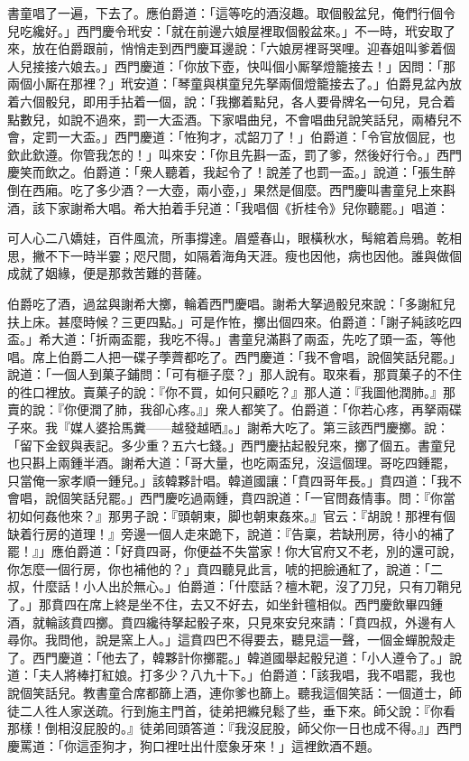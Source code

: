 書童唱了一遍，下去了。應伯爵道：「這等吃的酒沒趣。取個骰盆兒，俺們行個令兒吃纔好。」西門慶令玳安：「就在前邊六娘屋裡取個骰盆來。」不一時，玳安取了來，放在伯爵跟前，悄悄走到西門慶耳邊說：「六娘房裡哥哭哩。迎春姐叫爹着個人兒接接六娘去。」西門慶道：「你放下壺，快叫個小厮拏燈籠接去！」因問：「那兩個小厮在那裡？」玳安道：「琴童與棋童兒先拏兩個燈籠接去了。」伯爵見盆內放着六個骰兒，即用手拈着一個，說：「我擲着點兒，各人要骨牌名一句兒，見合着點數兒，如說不過來，罰一大盃酒。下家唱曲兒，不會唱曲兒說笑話兒，兩樁兒不會，定罰一大盃。」西門慶道：「恠狗才，忒韶刀了！」伯爵道：「令官放個屁，也欽此欽遵。你管我怎的！」叫來安：「你且先斟一盃，罰了爹，然後好行令。」西門慶笑而飲之。伯爵道：「衆人聽着，我起令了！說差了也罰一盃。」說道：「張生醉倒在西廂。吃了多少酒？一大壺，兩小壺，」果然是個麼。西門慶叫書童兒上來斟酒，該下家謝希大唱。希大拍着手兒道：「我唱個《折桂令》兒你聽罷。」唱道：

\begin{myquote} 
可人心二八嬌娃，百件風流，所事撐達。眉蹙春山，眼橫秋水，髩綰着烏鴉。乾相思，撇不下一時半霎；咫尺間，如隔着海角天涯。瘦也因他，病也因他。誰與做個成就了姻緣，便是那救苦難的菩薩。
\end{myquote} 

伯爵吃了酒，過盆與謝希大擲，輪着西門慶唱。謝希大拏過骰兒來說：「多謝紅兒扶上床。甚麼時候？三更四點。」可是作恠，擲出個四來。伯爵道：「謝子純該吃四盃。」希大道：「折兩盃罷，我吃不得。」書童兒滿斟了兩盃，先吃了頭一盃，等他唱。席上伯爵二人把一碟子荸薺都吃了。西門慶道：「我不會唱，說個笑話兒罷。」說道：「一個人到菓子鋪問：「可有榧子麼？」那人說有。取來看，那買菓子的不住的徃口裡放。賣菓子的說：『你不買，如何只顧吃？』那人道：『我圖他潤肺。』那賣的說：『你便潤了肺，我卻心疼。』」衆人都笑了。伯爵道：「你若心疼，再拏兩碟子來。我『媒人婆拾馬糞——越發越晒』。」{}謝希大吃了。第三該西門慶擲。說：「留下金釵與表記。多少重？五六七錢。」西門慶拈起骰兒來，擲了個五。書童兒也只斟上兩鍾半酒。謝希大道：「哥大量，也吃兩盃兒，沒這個理。哥吃四鍾罷，只當俺一家孝順一鍾兒。」該韓夥計唱。韓道國讓：「賁四哥年長。」賁四道：「我不會唱，說個笑話兒罷。」西門慶吃過兩鍾，賁四說道：「一官問姦情事。問：『你當初如何姦他來？』那男子說：『頭朝東，脚也朝東姦來。』官云：『胡說！那裡有個缺着行房的道理！』旁邊一個人走來跪下，說道：『告稟，若缺刑房，待小的補了罷！』」應伯爵道：「好賁四哥，你便益不失當家！你大官府又不老，別的還可說，你怎麼一個行房，你也補他的？」{}賁四聽見此言，唬的把臉通紅了，說道：「二叔，什麼話！小人出於無心。」伯爵道：「什麼話？檀木靶，沒了刀兒，只有刀鞘兒了。」{}那賁四在席上終是坐不住，去又不好去，如坐針氊相似。西門慶飲畢四鍾酒，就輪該賁四擲。賁四纔待拏起骰子來，只見來安兒來請：「賁四叔，外邊有人尋你。我問他，說是窯上人。」這賁四巴不得要去，聽見這一聲，一個金蟬脫殼走了。西門慶道：「他去了，韓夥計你擲罷。」韓道國舉起骰兒道：「小人遵令了。」說道：「夫人將棒打紅娘。打多少？八九十下。」伯爵道：「該我唱，我不唱罷，我也說個笑話兒。教書童合席都篩上酒，連你爹也篩上。聽我這個笑話：一個道士，師徒二人徃人家送疏。行到施主門首，徒弟把縧兒鬆了些，垂下來。師父說：『你看那樣！倒相沒屁股的。』徒弟囘頭答道：『我沒屁股，師父你一日也成不得。』」西門慶罵道：「你這歪狗才，狗口裡吐出什麼象牙來！」這裡飲酒不題。

